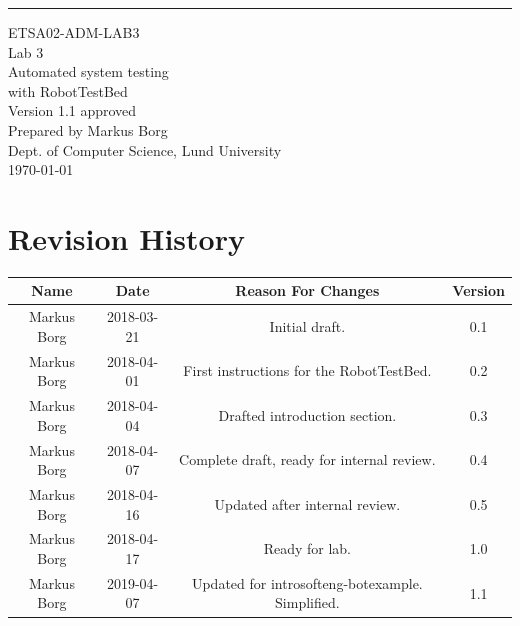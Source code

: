 \documentclass{scrreprt}
\date{}
\def\myversion{1.1 }
\begin{document}
\begin{flushright}
    \rule{16cm}{5pt}\vskip1cm
    \begin{bfseries}
    	\LARGE{ETSA02-ADM-LAB3}\\
    	\vspace{1.5cm}
        \Huge{Lab 3}\\
        \vspace{0.5cm}
        Automated system testing\\
        \vspace{0.5cm}
        with RobotTestBed\\
        \vspace{1.5cm}
        \LARGE{Version \myversion approved}\\
        \vspace{1.5cm}
        Prepared by Markus Borg\\
        Dept. of Computer Science, Lund University\\
        \vspace{1.5cm}
        \today\\
    \end{bfseries}
\end{flushright}


\chapter*{Revision History}

\begin{center}
    \begin{tabular}{|c|c|c|c|}
        \hline
	    Name & Date & Reason For Changes & Version\\
        \hline
	    Markus Borg & 2018-03-21 & Initial draft. & 0.1\\
        \hline
        Markus Borg & 2018-04-01 & First instructions for the RobotTestBed. & 0.2\\
        \hline
        Markus Borg & 2018-04-04 & Drafted introduction section. & 0.3\\
        \hline
        Markus Borg & 2018-04-07 & Complete draft, ready for internal review. & 0.4\\
        \hline
        Markus Borg & 2018-04-16 & Updated after internal review. & 0.5\\
        \hline
        Markus Borg & 2018-04-17 & Ready for lab. & 1.0\\
        \hline
        Markus Borg & 2019-04-07 & Updated for introsofteng-botexample. Simplified. & 1.1\\
        \hline
    \end{tabular}
\end{center}
\end{document}
